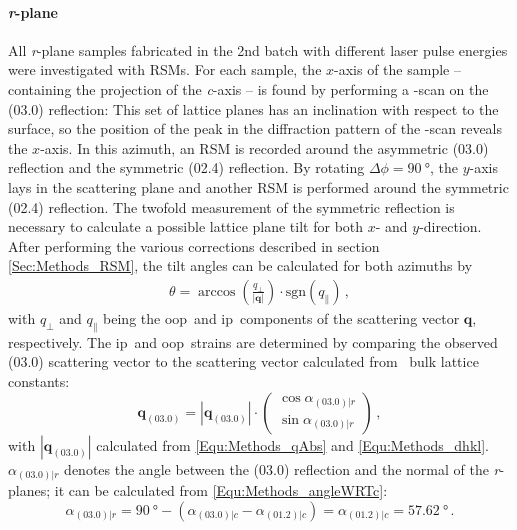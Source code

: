 \paragraph{\textit{r}-plane}
    All \textit{r}-plane samples fabricated in the 2nd batch with different laser pulse energies were investigated with \glspl{RSM}.
    For each sample, the $x$-axis of the sample -- containing the projection of the \textit{c}-axis -- is found by performing a \textphi-scan on the (03.0) reflection:
    This set of lattice planes has an inclination with respect to the surface, so the position of the peak in the diffraction pattern of the \textphi-scan reveals the $x$-axis.
    In this azimuth, an \gls{RSM} is recorded around the asymmetric (03.0) reflection and the symmetric (02.4) reflection.
    By rotating $\Delta\phi=\qty{90}{\degree}$, the $y$-axis lays in the scattering plane and another \gls{RSM} is performed around the symmetric (02.4) reflection.
    The twofold measurement of the symmetric reflection is necessary to calculate a possible lattice plane tilt for both $x$- and $y$-direction.
    After performing the various corrections described in section \ref{Sec:Methods_RSM}, the tilt angles can be calculated for both azimuths by
    \begin{eqnarray}
        \theta = \arccos\left(
            \frac{q_\perp}{|\mathbf{q}|}
        \right) \cdot\mathrm{sgn}\left(q_\parallel\right)\,,
        \label{Equ:Results_3_tiltAngle}
    \end{eqnarray}
    with $q_\perp$ and $q_\parallel$ being the \gls{oop}\ and \gls{ip}\ components of the scattering vector $\mathbf{q}$, respectively.
    The \gls{ip}\ and \gls{oop}\ strains are determined by comparing the observed (03.0) scattering vector to the scattering vector calculated from \cro\ bulk lattice constants:
    \begin{equation}
        \mathbf{q}_\mathrm{(03.0)} = 
        \left|\mathbf{q}_\mathrm{(03.0)}\right|\cdot
        \begin{pmatrix}
            \cos\alpha_{(03.0)|r}\\
            \sin\alpha_{(03.0)|r}
        \end{pmatrix}\,,
    \end{equation}
    with $|\mathbf{q}_{(03.0)}|$ calculated from \eqref{Equ:Methods_qAbs} and \eqref{Equ:Methods_dhkl}.
    $\alpha_{(03.0)|r}$ denotes the angle between the (03.0) reflection and the normal of the \textit{r}-planes; it can be calculated from \eqref{Equ:Methods_angleWRTc}:
    \begin{equation}
        \alpha_{(03.0)|r}
        = \qty{90}{\degree}-\left(
            \alpha_{(03.0)|c}-\alpha_{(01.2)|c}
        \right)
        = \alpha_{(01.2)|c}
        = \qty{57.62}{\degree}\,.
    \end{equation}

